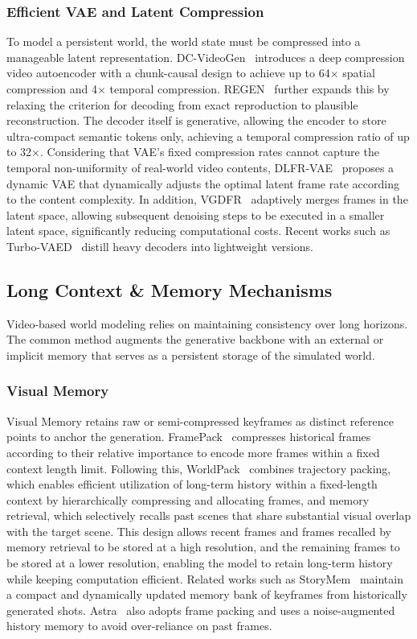 \documentclass[lettersize,journal]{IEEEtran}
\begin{document}
\subsubsection{Efficient VAE and Latent Compression}
To model a persistent world, the world state must be compressed into a manageable latent representation. DC-VideoGen~\cite{chen2025dc} introduces a deep compression video autoencoder with a chunk-causal design to achieve up to 64$\times$ spatial compression and 4$\times$ temporal compression. REGEN~\cite{zhang2025regen} further expands this by relaxing the criterion for decoding from exact reproduction to plausible reconstruction. The decoder itself is generative, allowing the encoder to store ultra-compact semantic tokens only, achieving a temporal compression ratio of up to 32$\times$. Considering that VAE's fixed compression rates cannot capture the temporal non-uniformity of real-world video contents, DLFR-VAE~\cite{yuan2025dlfr} proposes a dynamic VAE that dynamically adjusts the optimal latent frame rate according to the content complexity. In addition, VGDFR~\cite{yuan2025vgdfr} adaptively merges frames in the latent space, allowing subsequent denoising steps to be executed in a smaller latent space, significantly reducing computational costs.
Recent works such as Turbo-VAED~\cite{zou2025turbo} distill heavy decoders into lightweight versions.



\subsection{Long Context \& Memory Mechanisms}
Video-based world modeling relies on maintaining consistency over long horizons. The common method augments the generative backbone with an external or implicit memory that serves as a persistent storage of the simulated world.

\subsubsection{Visual Memory}
Visual Memory retains raw or semi-compressed keyframes as distinct reference points to anchor the generation. FramePack~\cite{zhang2025frame} compresses historical frames according to their relative importance to encode more frames within a fixed context length limit. Following this, WorldPack~\cite{oshima2025worldpack} combines trajectory packing, which enables efficient utilization of long-term history within a fixed-length context by hierarchically compressing and allocating frames, and memory retrieval, which selectively recalls past scenes that share substantial visual overlap with the target scene. This design allows recent frames and frames recalled by memory retrieval to be stored at a high resolution, and the remaining frames to be stored at a lower resolution, enabling the model to retain long-term history while keeping computation efficient.
Related works such as StoryMem~\cite{zhang2025storymem} maintain a compact and dynamically updated memory bank of keyframes from historically generated shots. Astra~\cite{zhu2026astra} also adopts frame packing and uses a noise-augmented history memory to avoid over-reliance on past frames.
\end{document}

